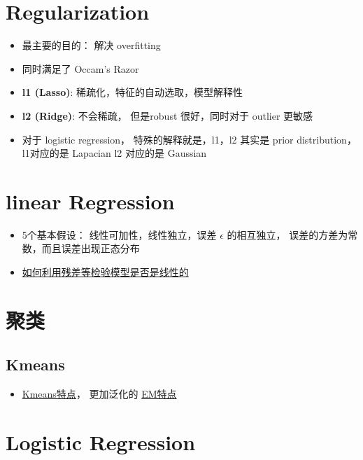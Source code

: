 \documentclass[12pt]{article}
\numberwithin{theorem}{section} %
\numberwithin{definition}{section} %
\numberwithin{assumption}{section} %
\numberwithin{lemma}{section} %
\numberwithin{remark}{section} %
\numberwithin{prop}{section} %
\numberwithin{corollary}{section} %
\numberwithin{example}{section} %
\numberwithin{question}{section} %
\numberwithin{problem}{section} %
\numberwithin{conjecture}{section} %
\numberwithin{append}{section} %
\numberwithin{property}{section} %
\begin{document}
\begin{CJK}{UTF8}{gbsn}
	
	\section{Regularization}
	\begin{itemize}
		\item 最主要的目的： 解决 overfitting
		\item 同时满足了 Occam's Razor
		\item \textbf{l1 (Lasso)}:  稀疏化，特征的自动选取，模型解释性
		\item \textbf{l2 (Ridge)}: 不会稀疏， 但是robust 很好，同时对于 outlier 更敏感
		\item 对于 logistic regression， 特殊的解释就是，l1，l2 其实是 prior distribution，l1对应的是 Lapacian l2 对应的是 Gaussian
	\end{itemize}



	\section{linear Regression}
	
	\begin{itemize}
		\item 5个基本假设： 线性可加性，线性独立，误差 $\epsilon$ 的相互独立， 误差的方差为常数，而且误差出现正态分布
		\item \href{https://blog.csdn.net/Noob_daniel/article/details/76087829}{如何利用残差等检验模型是否是线性的}
	\end{itemize}


	\section{聚类}
	\subsection{Kmeans}
	\begin{itemize}
		\item \href{https://www.jianshu.com/p/8f19b04fc0eb?utm_campaign=maleskine&utm_content=note&utm_medium=seo_notes&utm_source=recommendation}{Kmeans特点}， 更加泛化的
		\href{https://zhuanlan.zhihu.com/p/78311644}{EM特点}
	\end{itemize}

	\section{Logistic Regression}
	

\end{CJK}
\end{document}

